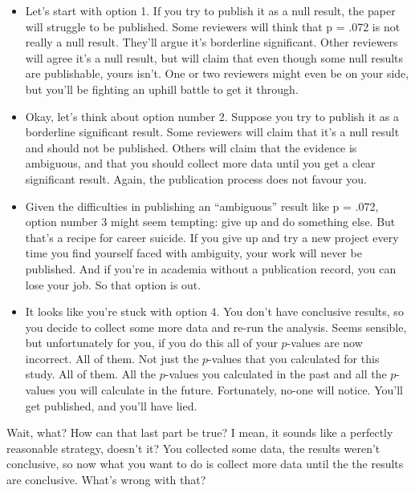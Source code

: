 \documentclass[
  a4paper,
]{book}
\begin{document}
\begin{itemize}
\item
  Let's start with option 1. If you try to publish it as a null result,
  the paper will struggle to be published. Some reviewers will think
  that p = .072 is not really a null result. They'll argue it's
  borderline significant. Other reviewers will agree it's a null result,
  but will claim that even though some null results are publishable,
  yours isn't. One or two reviewers might even be on your side, but
  you'll be fighting an uphill battle to get it through.
\item
  Okay, let's think about option number 2. Suppose you try to publish it
  as a borderline significant result. Some reviewers will claim that
  it's a null result and should not be published. Others will claim that
  the evidence is ambiguous, and that you should collect more data until
  you get a clear significant result. Again, the publication process
  does not favour you.
\item
  Given the difficulties in publishing an ``ambiguous'' result like p =
  .072, option number 3 might seem tempting: give up and do something
  else. But that's a recipe for career suicide. If you give up and try a
  new project every time you find yourself faced with ambiguity, your
  work will never be published. And if you're in academia without a
  publication record, you can lose your job. So that option is out.
\item
  It looks like you're stuck with option 4. You don't have conclusive
  results, so you decide to collect some more data and re-run the
  analysis. Seems sensible, but unfortunately for you, if you do this
  all of your \(p\)-values are now incorrect. All of them. Not just the
  \(p\)-values that you calculated for this study. All of them. All the
  \(p\)-values you calculated in the past and all the \(p\)-values you
  will calculate in the future. Fortunately, no-one will notice. You'll
  get published, and you'll have lied.
\end{itemize}

Wait, what? How can that last part be true? I mean, it sounds like a
perfectly reasonable strategy, doesn't it? You collected some data, the
results weren't conclusive, so now what you want to do is collect more
data until the the results are conclusive. What's wrong with that?
\end{document}

